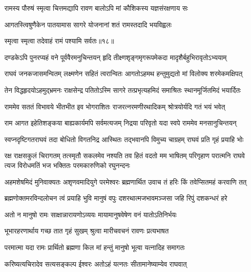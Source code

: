 \twolineshloka
{रामस्य पौरुषं स्मृत्वा चित्तमद्यापि रावण}
{बालोऽपि मां कौशिकस्य यज्ञसंरक्षणाय सः} %

\twolineshloka
{आगतस्त्विषुणैकेन पातयामास सागरे}
{योजनानां शतं रामस्तदादि भयविह्वलः} %

{स्मृत्वा स्मृत्वा तदेवाहं रामं पश्यामि सर्वतः॥१८॥} %


\fourlineindentedshloka
{दण्डकेऽपि पुनरप्यहं वने}
{पूर्ववैरमनुचिन्तयन् हृदि}
{तीक्ष्णशृङ्गमृगरूपमेकदा}
{मादृशैर्बहुभिरावृतोऽभ्ययाम्} %

\fourlineindentedshloka
{राघवं जनकजासमन्वितम्}
{लक्ष्मणेन सहितं त्वरान्वितः}
{आगतोऽहमथ हन्तुमुद्यतो}
{मां विलोक्य शरमेकमक्षिपत्} %

\fourlineindentedshloka
{तेन विद्धहृदयोऽहमुद्भ्रमनः}
{राक्षसेन्द्र पतितोऽस्मि सागरे}
{तत्प्रभृत्यहमिदं समाश्रितः}
{स्थानमूर्जितमिदं भयार्दितः} %

\fourlineindentedshloka
{राममेव सततं विभावये}
{भीतभीत इव भोगराशितः}
{राजरत्नरमणीरथादिकम्}
{श्रोत्रयोर्यदि गतं भयं भवेत्} %

\fourlineindentedshloka
{राम आगत इहेतिशङ्कया}
{बाह्यकार्यमपि सर्वमत्यजम्}
{निद्रया परिवृतो यदा स्वपे}
{राममेव मनसानुचिन्तयन्} %

\fourlineindentedshloka
{स्वप्नदृष्टिगतराघवं तदा}
{बोधितो विगतनिद्र आस्थितः}
{तद्भवानपि विमुच्य चाग्रहम्}
{राघवं प्रति गृहं प्रयाहि भोः} %

\fourlineindentedshloka
{रक्ष राक्षसकुलं चिरागतम्}
{तत्स्मृतौ सकलमेव नश्यति}
{तव हितं वदतो मम भाषितम्}
{परिगृहाण परात्मनि राघवे}
{त्यज विरोधमतिं भज भक्तितः}
{परमकारुणिको रघुनन्दनः} %

\fourlineindentedshloka
{अहमशेषमिदं मुनिवाक्यतः}
{अशृणवमादियुगे परमेश्वरः}
{ब्रह्मणार्थित उवाच तं हरिः}
{किं तवेप्सितमहं करवाणि तत्} %

\fourlineindentedshloka
{ब्रह्मणोक्तमरविन्दलोचन}
{त्वं प्रयाहि भुवि मानुषं वपुः}
{दशरथात्मजभावमञ्जसा}
{जहि रिपुं दशकन्धरं हरे} %

\twolineshloka
{अतो न मानुषो रामः साक्षान्नारायणोऽव्ययः}
{मायामानुषवेषेण वनं यातोऽतिनिर्भयः} %

\twolineshloka
{भूभारहरणार्थाय गच्छ तात गृहं सुखम्}
{श्रुत्वा मारीचवचनं रावणः प्रत्यभाषत} %

\twolineshloka
{परमात्मा यदा रामः प्रार्थितो ब्रह्मणा किल}
{मां हन्तुं मानुषो भूत्वा यत्नादिह समागतः} %

\twolineshloka
{करिष्यत्यचिरादेव सत्यसङ्कल्प ईश्वरः}
{अतोऽहं यत्नतः सीतामानेष्याम्येव राघवात्} %

